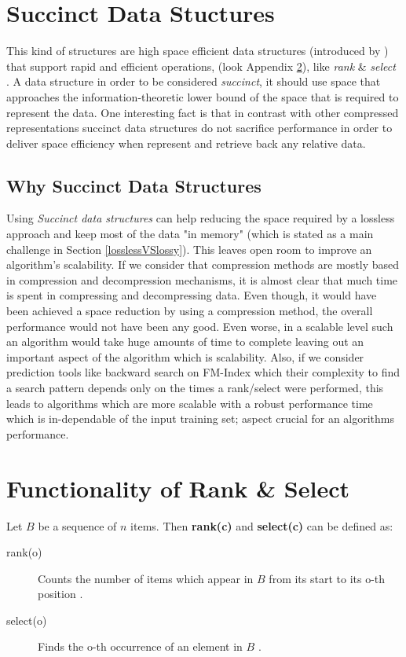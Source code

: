 \newpage
\appendix


\section{Succinct Data Stuctures} \label{App:SDS}
This kind of structures are high space efficient data structures (introduced by \citeauthor{Jacobson89} \citeyear{Jacobson89}) that support rapid and efficient operations, (look Appendix \ref{App:rank_select}), like \emph{rank} \& \emph{select} \cite{dillabaugh_2007, Jacobson89}. A data structure in order to be considered \emph{succinct}, it should use space that approaches the information-theoretic lower bound of the space that is required to represent the data. One interesting fact is that in contrast with other compressed representations succinct data structures do not sacrifice performance in order to deliver space efficiency when represent and retrieve back any relative data. 
\subsection{Why Succinct Data Structures}
Using \emph{Succinct data structures} can help reducing the space required by a lossless approach and keep most of the data "in memory" (which is stated as a main challenge in Section \ref{losslessVSlossy}). This leaves open room to improve an algorithm's scalability. If we consider that compression methods are mostly based in compression and decompression mechanisms, it is almost clear that much time is spent in compressing and decompressing data. Even though, it would have been achieved a space reduction by using a compression method, the overall performance would not have been any good. Even worse, in a scalable level such an algorithm would take huge amounts of time to complete leaving out an important aspect of the algorithm which is scalability. Also, if we consider prediction tools like backward search on FM-Index \cite{Ferragina} which their complexity to find a search pattern depends only on the times a rank/select were performed, this leads to algorithms which are more scalable with a robust performance time which is in-dependable of the input training set; aspect crucial for an algorithms performance.



\section{Functionality of Rank \& Select}\label{App:rank_select}
Let \(B\) be a sequence of \(n\) items. Then \textbf{rank(c)} and \textbf{select(c)} can be defined as:
\begin{description}
  \item[rank(o)] 
  Counts the number of items which appear in \(B\) from its start to its o-th position \cite{Jacobson89}.
  \item[select(o)]
  Finds the o-th occurrence of an element in \(B\) \cite{Jacobson89}.
\end{description}

